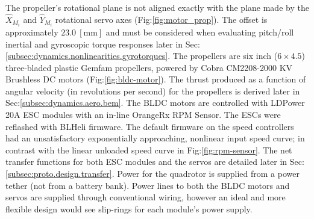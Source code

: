 The propeller's rotational plane is not aligned exactly with the plane made by the $\hat{X}_{M_i}$ and $\hat{Y}_{M_i}$ rotational servo axes (Fig:\ref{fig:motor_prop}). The offset is approximately $23.0~[\text{mm}]$ and must be considered when evaluating pitch/roll inertial and gyroscopic torque responses later in Sec:\ref{subsec:dynamics.nonlinearities.gyrotorques}. The propellers are six inch ($6 \times 4.5$) three-bladed plastic Gemfam propellers, powered by Cobra CM2208-2000 KV Brushless DC motors (Fig:\ref{fig:bldc-motor}). The thrust produced as a function of angular velocity (in revolutions per second) for the propellers is derived later in Sec:\ref{subsec:dynamics.aero.bem}. 
\newpage
The BLDC motors are controlled with LDPower 20A ESC modules with an in-line OrangeRx RPM Sensor. The ESCs were reflashed with BLHeli\cite{BLHeli} firmware. The default firmware on the speed controllers had an unsatisfactory exponentially approaching, nonlinear input speed curve; in contrast with the linear unloaded speed curve in Fig:\ref{fig:rpm-sensor}. The net transfer functions for both ESC modules and the servos are detailed later in Sec:\ref{subsec:proto.design.transfer}. Power for the quadrotor is supplied from a power tether (not from a battery bank). Power lines to both the BLDC motors and servos are supplied through conventional wiring, however an ideal and more flexible design would see slip-rings for each module's power supply. 

